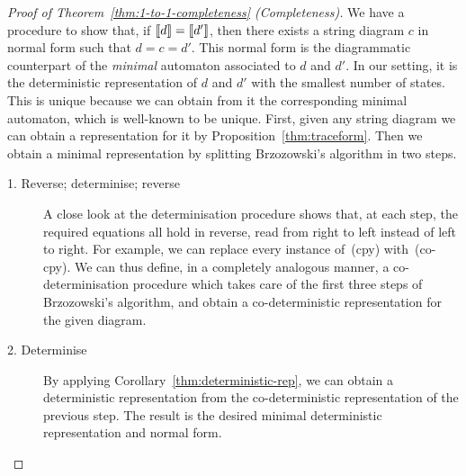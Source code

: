 \documentclass{lmcs}
\theoremstyle{plain}\newtheorem{satz}[thm]{Satz} %
\begin{document}
\begin{proof}[Proof of Theorem~\ref{thm:1-to-1-completeness} (Completeness)]\label{proof:completeness}
We have a procedure to show that, if $\left\llbracket{d}\right\rrbracket=\left\llbracket{d'}\right\rrbracket$, then there exists a string diagram $c$ in normal form such that  $d=c=d'$. This normal form is the diagrammatic counterpart of the \emph{minimal} automaton associated to $d$ and $d'$. In our setting, it is the deterministic representation of $d$ and $d'$ with the smallest number of states. This is unique because we can obtain from it the corresponding minimal automaton, which is well-known to be unique. First, given any string diagram we can obtain a representation for it by Proposition~\ref{thm:traceform}. Then we obtain a minimal representation by splitting Brzozowski's algorithm in two steps.
\begin{description}
\item[1. Reverse; determinise; reverse] A close look at the determinisation procedure
%
shows that, at each step, the required equations all hold in reverse, read from right to left instead of left to right. For example, we can replace every instance of~(cpy) with~(co-cpy).
%
We can thus define, in a completely analogous manner, a co-determinisation procedure which takes care of the first three steps of Brzozowski's algorithm, and obtain a co-deterministic representation for the given diagram.
\item[2. Determinise]  By applying  Corollary~\ref{thm:deterministic-rep}, we can obtain a deterministic representation from the co-deterministic representation of the previous step. The result is the desired minimal deterministic representation and normal form. \qedhere
\end{description}
%
\end{proof}
\end{document}
